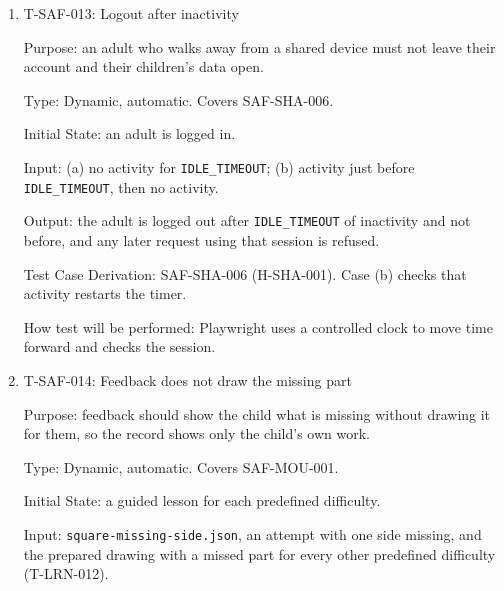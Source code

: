 \documentclass[12pt, titlepage]{article}
\newcommand{\testitem}[1]{\item #1\par\nopagebreak}
\begin{document}
\begin{enumerate}
Type: Dynamic, manual. Covers SAF-SHA-002.

Initial State: an account whose adult name and email, and the child
profile's identifier, are unique marker strings.

Input: the tester uses every feature, including refinement, while recording
all network traffic.

Output: no request to an outside service contains any marker string, and
requests go only to approved destinations.

Test Case Derivation: the fit criterion of SAF-SHA-002 (H-SHA-002). Unique
markers make any leak easy to find.

How test will be performed: the test runs in Chrome on a laptop; the
DevTools Network panel is exported as a HAR file and searched for the
markers and for destinations that are not approved.

\testitem{T-SAF-013: Logout after inactivity}

Purpose: an adult who walks away from a shared device must not leave their
account and their children's data open.

Type: Dynamic, automatic. Covers SAF-SHA-006.

Initial State: an adult is logged in.

Input: (a) no activity for \texttt{IDLE\_TIMEOUT}; (b) activity just before
\texttt{IDLE\_TIMEOUT}, then no activity.

Output: the adult is logged out after \texttt{IDLE\_TIMEOUT} of
inactivity and not before, and any later request using that session is
refused.

Test Case Derivation: SAF-SHA-006 (H-SHA-001). Case (b) checks that
activity restarts the timer.

How test will be performed: Playwright uses a controlled clock to move time
forward and checks the session.

\testitem{T-SAF-014: Feedback does not draw the missing part}

Purpose: feedback should show the child what is missing without drawing it
for them, so the record shows only the child's own work.

Type: Dynamic, automatic. Covers SAF-MOU-001.

Initial State: a guided lesson for each predefined difficulty.

Input: \texttt{square-\allowbreak{}missing-\allowbreak{}side.json}, an attempt
with one side missing, and the prepared drawing with a missed part for every
other predefined difficulty (T-LRN-012).


\end{enumerate}
\end{document}
